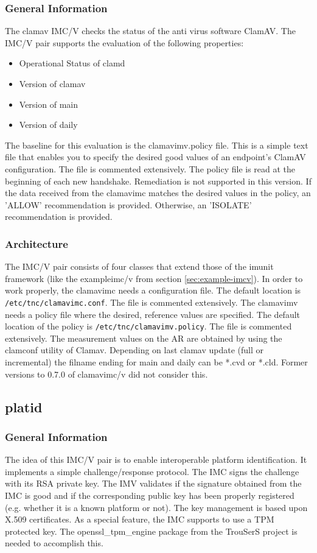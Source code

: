 \documentclass[a4paper,10pt]{scrartcl}
\begin{document}
\subsubsection{General Information}
The clamav IMC/V checks the status of the anti virus software ClamAV. The IMC/V pair
supports the evaluation of the following properties:
\begin{itemize}
	\item Operational Status of clamd
	\item Version of clamav
	\item Version of main
	\item Version of daily
\end{itemize}
The baseline for this evaluation is the clamavimv.policy file. This is a simple
text file that enables you to specify the desired good values of an endpoint's
ClamAV configuration. The file is commented extensively. The policy file is
read at the beginning of each new handshake. Remediation is not supported in
this version. If the data received from the clamavimc matches the desired values
in the policy, an 'ALLOW' recommendation is provided. Otherwise, an 'ISOLATE'
recommendation is provided.

\subsubsection{Architecture}
The IMC/V pair consists of four classes that extend those of the imunit framework (like
the exampleimc/v from section \ref{sec:example-imcv}). In order to work properly,
the clamavimc needs a configuration file. The default location is
\texttt{/etc/tnc/clamavimc.conf}. The file is commented extensively. The clamavimv
needs a policy file where the desired, reference values are specified. The default
location of the policy is \texttt{/etc/tnc/clamavimv.policy}. The file is commented
extensively. The measurement values on the AR are obtained by using the clamconf
utility of Clamav. Depending on last clamav update (full or incremental) the filname 
ending for main and daily can be *.cvd or *.cld. Former versions to 0.7.0 of clamavimc/v
did not consider this. 

\subsection{platid}
\subsubsection{General Information}
The idea of this IMC/V pair is to enable interoperable platform identification.
It implements a simple challenge/response protocol. The IMC signs the challenge
with its RSA private key. The IMV validates if the signature obtained from the
IMC is good and if the corresponding public key has been properly registered (e.g.
whether it is a known platform or not). The key management is based upon
X.509 certificates. As a special feature, the IMC supports to use a TPM protected
key. The openssl\_tpm\_engine package from the TrouSerS project is needed to accomplish
this.
\end{document}
